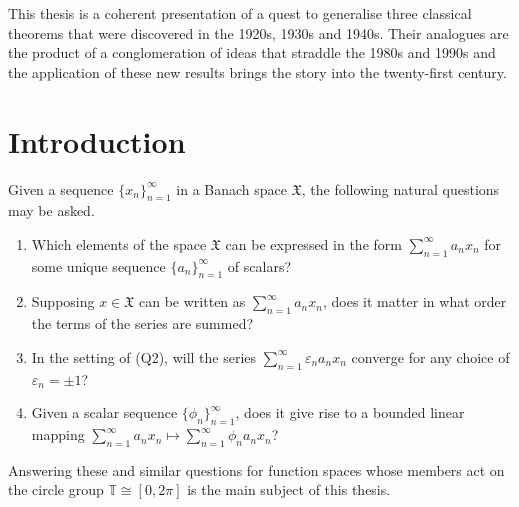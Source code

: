 \documentclass[mmath,12pt]{unswthesis}   %
\newcommand{\T}{\mathbb{T}}
\newcommand{\X}{\mathfrak{X}}
\newcommand\blankpage{%
    \null
    \thispagestyle{empty}%
    \addtocounter{page}{-1}%
    \newpage}
\numberwithin{equation}{section}
\begin{document}


This thesis is a coherent presentation of a quest to generalise three classical
theorems that were discovered in the 1920s, 1930s and 1940s. Their analogues are
the product of a conglomeration of ideas that straddle the 1980s and 1990s and
the application of these new results brings the story into the twenty-first
century.
\afterpage{\blankpage}


\afterpreface





%
%




\afterpage{\blankpage}

\chapter{Introduction}\label{s-intro}

{\noindent}Given a sequence $\{x_n\}_{n=1}^{\infty}$ in a Banach space $\X$,
the following natural questions may be asked.
\begin{enumerate}
\item[(Q1)] Which elements of the space $\X$ can be expressed in the form
$\sum_{n=1}^{\infty}a_nx_n$ for some unique sequence $\{a_n\}_{n=1}^{\infty}$
of scalars?

\item[(Q2)] Supposing $x\in\X$ can be written as $\sum_{n=1}^{\infty}a_nx_n$,
does it matter in what order the terms of the series are summed?

\item[(Q3)] In the setting of (Q2), will the series
$\sum_{n=1}^{\infty}\varepsilon_na_nx_n$ converge for any choice of
$\varepsilon_n=\pm 1$?

\item[(Q4)] Given a scalar sequence $\{\phi_n\}_{n=1}^{\infty}$, does it give
rise to a bounded linear mapping
$\sum_{n=1}^{\infty}a_nx_n\mapsto\sum_{n=1}^{\infty}\phi_na_nx_n$?
\end{enumerate}

{\noindent}Answering these and similar questions for
function spaces whose members act on the circle group $\T\cong[0,2\pi]$
is the main subject of this thesis.
\end{document}
